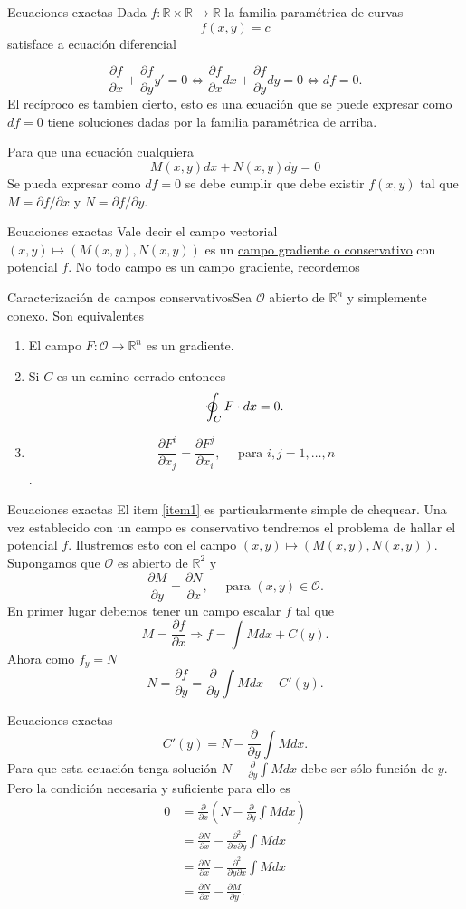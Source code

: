 \documentclass{article}
\newcommand{\rr}{\mathbb{R}}
\newcommand{\der}[2]{\frac{\partial #1}{\partial #2}}
\begin{document}
{Ecuaciones exactas}
 Dada $f:\rr\times\rr\to\rr$ la familia paramétrica de curvas
\[f(x,y)=c\]
satisface a ecuación diferencial

\[
 \frac{\partial f}{\partial x}+\frac{\partial f}{\partial y}y'=0\Longleftrightarrow \frac{\partial f}{\partial x}dx+\frac{\partial f}{\partial y}dy=0
 \Longleftrightarrow df=0.
\]
 El recíproco es tambien cierto, esto es una ecuación que se puede expresar como $df=0$  tiene soluciones dadas por la familia paramétrica de arriba. 

 Para que una ecuación cualquiera
\[M(x,y)dx+N(x,y)dy=0\]
Se pueda expresar como $df=0$ se debe cumplir que debe existir $f(x,y)$ tal que $M=\partial f/\partial x$ y $N=\partial f/\partial y$.


{Ecuaciones exactas}\label{camposconservativos}
 Vale decir el campo vectorial $(x,y)\mapsto (M(x,y),N(x,y))$ es un \href{http://es.wikipedia.org/wiki/Fuerza_conservativa}{campo 
gradiente o conservativo} con potencial $f$. No todo campo es un campo gradiente, recordemos

 {Caracterización de campos conservativos}Sea $\mathcal{O}$ abierto de $\rr^n$ y simplemente conexo. Son equivalentes
 \begin{enumerate}
  \item El campo $F:\mathcal{O}\to\rr^n$ es un gradiente.
  \item Si $C$ es un camino cerrado entonces
  \[\varointctrclockwise_C F\cdot d x=0.\]
  \item\label{item1} \[\frac{\partial F^i}{\partial x_j}=\frac{\partial F^j}{\partial x_i},\quad\text{ para }i,j=1,\ldots,n\]. 
 \end{enumerate}





{Ecuaciones exactas}
El item \ref{item1}  es particularmente simple de chequear. Una vez establecido con un campo es conservativo tendremos el problema de hallar el potencial $f$. 
Ilustremos esto con el campo $(x,y)\mapsto (M(x,y),N(x,y))$. Supongamos que $\mathcal{O}$ es abierto de $\rr^2$ y
\[\frac{\partial M}{\partial y}=\frac{\partial N}{\partial x},\quad\text{ para } (x,y)\in \mathcal{O}.\] 
En primer lugar debemos tener un campo escalar $f$ tal que
\[M=\frac{\partial f}{\partial x}\Rightarrow f=\int Mdx +C(y).\]
Ahora como $f_y=N$
\[N=\frac{\partial f}{\partial y}=\frac{\partial}{\partial y}\int Mdx +C'(y).\]



{Ecuaciones exactas}
\[C'(y)=N-\frac{\partial}{\partial y}\int Mdx .\]
 Para que esta ecuación tenga solución $N-\frac{\partial}{\partial y}\int Mdx$ debe ser sólo función de $y$. Pero la condición necesaria y suficiente para ello es 
\[\begin{split}0&=\frac{\partial}{\partial x}\left(N-\frac{\partial}{\partial y}\int Mdx\right)\\
&= \der{N}{x}-\frac{\partial^2}{\partial x\partial y}\int Mdx\\
&=\der{N}{x}-\frac{\partial^2}{\partial y\partial x}\int Mdx\\
&=\der{N}{x}-\der{M}{y}.
   \end{split}
\]
\end{document}
